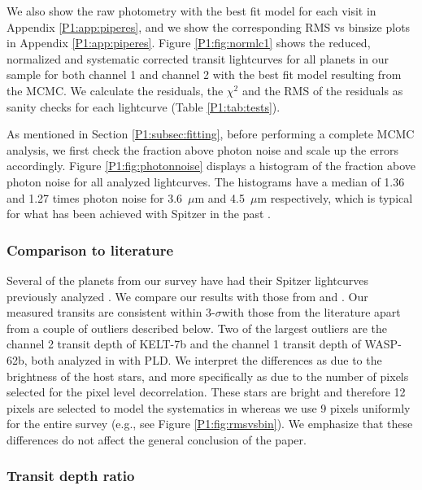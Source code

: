 We also show the raw photometry with the best fit model for each visit in Appendix \ref{P1:app:piperes}, and we show the corresponding RMS vs binsize plots in Appendix \ref{P1:app:piperes}. Figure \ref{P1:fig:normlc1} shows the reduced, normalized and systematic corrected transit lightcurves for all planets in our sample for both channel 1 and channel 2 with the best fit model resulting from the MCMC. We calculate the residuals, the $\chi^2$ and the RMS of the residuals as sanity checks for each lightcurve (Table \ref{P1:tab:tests}).

As mentioned in Section \ref{P1:subsec:fitting}, before performing a complete MCMC analysis, we first check the fraction above photon noise and scale up the errors accordingly. Figure \ref{P1:fig:photonnoise} displays a histogram of the fraction above photon noise for all analyzed lightcurves. The histograms have a median of 1.36 and 1.27 times photon noise for 3.6~$\mu$m and 4.5~$\mu$m respectively, which is typical for what has been achieved with Spitzer in the past \citep{Ingalls2016}.

\subsubsection{Comparison to literature}

Several of the planets from our survey have had their Spitzer lightcurves previously analyzed \citet[e.g.,][]{Sing2016, Garhart2020}. We compare our results with those from \citet{Sing2016} and \citet{Garhart2020}. Our measured transits are consistent within 3-$\sigma$with those from the literature apart from a couple of outliers described below. Two of the largest outliers are the channel 2 transit depth of KELT-7b and the channel 1 transit depth of WASP-62b, both analyzed in \citet{Garhart2020} with PLD. We interpret the differences as due to the brightness of the host stars, and more specifically as due to the number of pixels selected for the pixel level decorrelation. These stars are bright and therefore 12 pixels are selected to model the systematics in \citet{Garhart2020} whereas we use 9 pixels uniformly for the entire survey (e.g., see Figure \ref{P1:fig:rmsvsbin}). We emphasize that these differences do not affect the general conclusion of the paper.

\subsubsection{Transit depth ratio}
\label{P1:subsec:transit}

